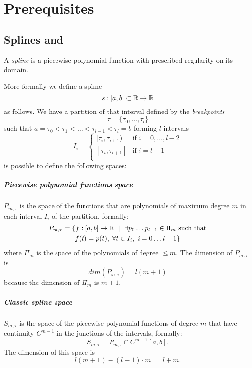 \documentclass[dissertation.tex]{subfiles}
\begin{document}
\chapter{Prerequisites}
\section{Splines and \bss}\label{sec:spline}
A \emph{spline} is a piecewise polynomial function with prescribed
regularity on its domain.

More formally we define a spline \cite{deboor}\cite{farin}
$$s:[a,b]\subset\mathbb{R}\rightarrow\mathbb{R}$$
as follows.
We have a partition of that interval defined by the \emph{breakpoints}
$$\tau = \{\tau_0,\dots,\tau_l\}$$
such that $a=\tau_0<\tau_1<\dots<\tau_{l-1}<\tau_l=b$ forming $l$
intervals
$$
I_i=
\begin{cases}
  [\tau_i,\tau_{i+1}) & \mbox{if } i=0,\dots,l-2\\
    [\tau_i,\tau_{i+1}] & \mbox{if } i=l-1\\
\end{cases}
$$
is possible to define the following spaces:
\paragraph{Piecewise polynomial functions space} $P_{m,\tau}$
is the space of the functions that are polynomials of maximum degree $m$
in each interval $I_i$ of the partition, formally:
\begin{multline*}
  P_{m,\tau}=\{f:[a,b]\rightarrow\mathbb{R}\ \mid\ \exists p_0\dots
  p_{l-1}\in\Pi_m \ \text{such that}\\
  f(t)=p(t),\ \forall t\in I_i,\
  i=0\dots l-1\}
\end{multline*}
where $\Pi_m$ is the space of the polynomials of degree $\le m$. The
dimension of $P_{m,\tau}$ is
\begin{equation*}
  dim(P_{m,\tau})=l(m+1)
\end{equation*}
because the dimension of $\Pi_m$
is $m+1$.
\paragraph{Classic spline space} $S_{m,\tau}$ is the space of
the piecewise polynomial functions of degree $m$ that have continuity
$C^{m-1}$ in
the junctions of the intervals, formally:
$$
S_{m,\tau}=P_{m,\tau}\cap C^{m-1}[a,b].
$$
The dimension of this space is
\begin{equation}
  \label{eq:dimClassicSpline}
  l(m+1)-(l-1)\cdot m\,=\,l+m.
\end{equation}
\end{document}
